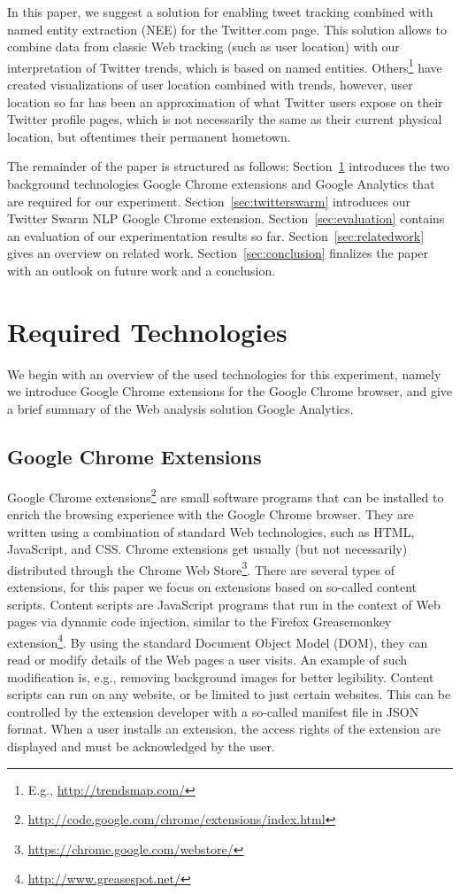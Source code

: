 \documentclass[runningheads,a4paper]{llncs}
\begin{document}
In this paper, we suggest a solution for enabling tweet tracking combined with named entity extraction (NEE) for the Twitter.com page. This solution allows to combine data from classic Web tracking (such as user location) with our interpretation of Twitter trends, which is based on named entities. Others\footnote{E.g., \url{http://trendsmap.com/}} have created visualizations of user location combined with trends, however, user location so far has been an approximation of what Twitter users expose on their Twitter profile pages, which is not necessarily the same as their current physical location, but oftentimes their permanent hometown. 

The remainder of the paper is structured as follows: Section~\ref{sec:reqtec} introduces the two background technologies Google Chrome extensions and Google Analytics that are required for our experiment. Section~\ref{sec:twitterswarm} introduces our Twitter Swarm NLP Google Chrome extension. Section~\ref{sec:evaluation} contains an evaluation of our experimentation results so far. Section~\ref{sec:relatedwork} gives an overview on related work. Section~\ref{sec:conclusion} finalizes the paper with an outlook on future work and a conclusion.

\section{Required Technologies}\label{sec:reqtec}
We begin with an overview of the used technologies for this experiment, namely we introduce Google Chrome extensions for the Google Chrome browser, and give a brief summary of the Web analysis solution Google Analytics.

\subsection{Google Chrome Extensions}
Google Chrome extensions\footnote{\url{http://code.google.com/chrome/extensions/index.html}} are small software programs that can be installed to enrich the browsing experience with the Google Chrome browser. They are written using a combination of standard Web technologies, such as HTML, JavaScript, and CSS. Chrome extensions get usually (but not necessarily) distributed through the Chrome Web Store\footnote{\url{https://chrome.google.com/webstore/}}. There are several types of extensions, for this paper we focus on extensions based on so-called content scripts. Content scripts are JavaScript programs that run in the context of Web pages via dynamic code injection, similar to the Firefox Greasemonkey extension\footnote{\url{http://www.greasespot.net/}}. By using the standard Document Object Model (DOM), they can read or modify details of the Web pages a user visits. An example of such modification is, e.g., removing background images for better legibility. Content scripts can run on any website, or be limited to just certain websites. This can be controlled by the extension developer with a so-called manifest file in JSON format. When a user installs an extension, the access rights of the extension are displayed and must be acknowledged by the user.
\end{document}
